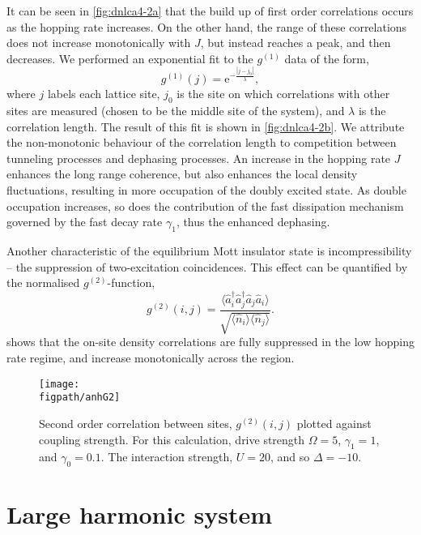 It can be seen in \cref{fig:dnlca4-2a} that the build up of first order correlations occurs as the hopping rate increases. On the other hand, the range of these correlations does not increase monotonically with \(J\), but instead reaches a peak, and then decreases. We performed an exponential fit to the \(g^{(1)}\) data of the form,
\begin{equation}
	g^{(1)}(j) = \mathrm{e}^{-\frac{|j-j_{0}|}{\lambda}},
	\label{eq:dnlca4-2}
\end{equation}
where \(j\) labels each lattice site, \(j_{0}\) is the site on which correlations with other sites are measured (chosen to be the middle site of the system), and \(\lambda\) is the correlation length. The result of this fit is shown in \cref{fig:dnlca4-2b}. We attribute the non-monotonic behaviour of the correlation length to competition between tunneling processes and dephasing processes. An increase in the hopping rate \(J\) enhances the long range coherence, but also enhances the local density fluctuations, resulting in more occupation of the doubly excited state. As double occupation increases, so does the contribution of the fast dissipation mechanism governed by the fast decay rate \(\gamma_{1}\), thus the enhanced dephasing.

Another characteristic of the equilibrium Mott insulator state is incompressibility -- the suppression of two-excitation coincidences. This effect can be quantified by the normalised \(g^{(2)}\)-function,
\begin{equation}
	g^{(2)}(i,j) = \frac{\langle \hat{a}_{i}^{\dagger}\hat{a}_{j}^{\dagger}\hat{a}_{j}\hat{a}_{i} \rangle}{\sqrt{\langle \hat{n}_{i} \rangle \langle \hat{n}_{j} \rangle}}.
	\label{eq:dnlca4-3}
\end{equation}
 shows that the on-site density correlations are fully suppressed in the low hopping rate regime, and increase monotonically across the region.

\begin{figure}[ht]
	\centering
	\texttt{[image: \\figpath/anhG2]}
	\caption{\label{fig:dnlca4-3} Second order correlation between sites, \(g^{(2)}(i,j)\) plotted against coupling strength. For this calculation, drive strength \(\Omega = 5\), \(\gamma_{1} = 1\), and \(\gamma_{0} = 0.1\). The interaction strength, \(U=20\), and so \(\Delta = -10\).}
\end{figure}

\section{Large harmonic system}

